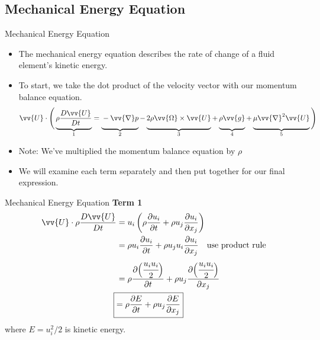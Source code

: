 \subsection{Mechanical Energy Equation}
\begin{frame}{Mechanical Energy Equation}
\begin{itemize}
	\item The mechanical energy equation describes the rate of change of a fluid element's kinetic energy.
	\item To start, we take the dot product of the velocity vector with our momentum balance equation.
	$$\vv{U} \cdot \Bigg(\underbrace{\vphantom{-\frac{1}{\rho}\vv{\nabla}p}\rho\frac{D\vv{U}}{Dt}}_{1} = \underbrace{\vphantom{-\frac{1}{\rho}\vv{\nabla}p}-\vv{\nabla}p}_{2} - \underbrace{\vphantom{-\frac{1}{\rho}\vv{\nabla}p}2\rho\vv{\Omega}\times \vv{U}}_{3} + \underbrace{\vphantom{-\frac{1}{\rho}\vv{\nabla}p}\rho\vv{g}}_{4} + \underbrace{\vphantom{-\frac{1}{\rho}\vv{\nabla}p}\mu \vv{\nabla}^2\vv{U}}_{5}\Bigg)$$
	\item Note: We've multiplied the momentum balance equation by $\rho$
	\item We will examine each term separately and then put together for our final expression.
\end{itemize}
\end{frame}
\begin{frame}{Mechanical Energy Equation}
\textbf{Term 1}
\begin{align*}
	\vv{U} \cdot \rho\frac{D\vv{U}}{Dt} &= u_i\left(\rho\frac{\partial u_i}{\partial t} + \rho u_j \frac{\partial u_i}{\partial x_j}\right)\\
	&= \rho u_i \frac{\partial u_i}{\partial t} + \rho u_j u_i\frac{\partial u_i}{\partial x_j} \quad \text{use product rule}\\
	&= \rho \frac{\partial \Big(\cfrac{u_i u_i}{2}\Big)}{\partial t} + \rho u_j \frac{\partial \Big(\cfrac{u_i u_i}{2}\Big)}{\partial x_j}\\
	\Aboxed{&= \rho \frac{\partial E}{\partial t} + \rho u_j\frac{\partial E}{\partial x_j}}
\end{align*}
where $E = u_i^2/2$ is kinetic energy.
\end{frame}

